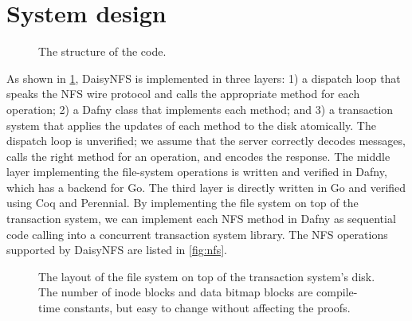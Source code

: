 \section{System design}%
\label{sec:daisy:system}


\begin{figure}
  \center
  
  \caption{The structure of the code.}
  \label{fig:system}
\end{figure}

As shown in \cref{fig:system}, DaisyNFS is implemented in three layers:
1) a dispatch loop that speaks the NFS wire protocol and calls the
appropriate method for each operation; 2) a Dafny class that
implements each method; and 3) a transaction system that applies the
updates of each method to the disk atomically.  The dispatch loop is
unverified; we assume that the server correctly decodes messages,
calls the right method for an operation, and encodes the response. The
middle layer implementing the file-system operations is written
and verified in Dafny, which has a backend for Go.  The
third layer is directly written in Go and verified using Coq and
Perennial.  By implementing the file system on top of the transaction
system, we can implement each NFS method in Dafny as sequential code
calling into a concurrent transaction system library. The NFS
operations supported by DaisyNFS are listed in \cref{fig:nfs}.


\begin{figure}
  
  \caption{The layout of the file system on top of the transaction system's
    disk. The number of inode blocks and data bitmap blocks are compile-time
    constants, but easy to change without affecting the proofs.}
  \label{fig:layout}
\end{figure}

